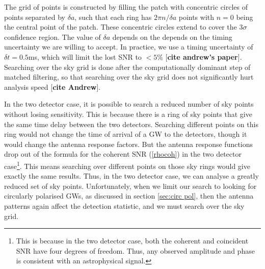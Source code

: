 \documentclass[11pt]{cuthesis}
\begin{document}
The grid of points is constructed by filling the patch with concentric circles of points separated by $\delta a$, such that each ring has $2\pi n / \delta a$ points with $n=0$ being the central point of the patch. These concentric circles extend to cover the $3\sigma$ confidence region. The value of $\delta a$ depends on the depends on the timing uncertainty we are willing to accept. In practice, we use a timing uncertainty of $\delta t = 0.5$ms, which will limit the lost SNR to $<5\%$ [\textbf{cite andrew's paper}]. Searching over the sky grid is done after the computationally dominant step of matched filtering, so that searching over the sky grid does not significantly hurt analysis speed [\textbf{cite Andrew}].

In the two detector case, it is possible to search a reduced number of sky points without losing sensitivity. This is because there is a ring of sky points that give the same time delay between the two detectors. Searching different points on this ring would not change the time of arrival of a GW to the detectors, though it would change the antenna response factors. But the antenna response functions drop out of the formula for the coherent SNR (\ref{rhocoh}) in the two detector case\footnote{This is because in the two detector case, both the coherent and coincident SNR have four degrees of freedom. Thus, any observed amplitude and phase is consistent with an astrophysical signal.}. This means searching over different points on those sky rings would give exactly the same results. Thus, in the two detector case, we can analyse a greatly reduced set of sky points. Unfortunately, when we limit our search to looking for circularly polarised GWs, as discussed in section \ref{sec:circ pol}, then the antenna patterns again affect the detection statistic, and we must search over the sky grid.
\end{document}
